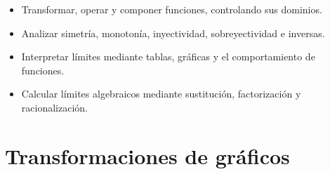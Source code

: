 \documentclass[10pt,a5paper]{article}
\begin{document}

\begin{objetivos}
\begin{itemize}
  \item Transformar, operar y componer funciones, controlando sus dominios.
  \item Analizar simetría, monotonía, inyectividad, sobreyectividad e inversas.
  \item Interpretar límites mediante tablas, gráficas y el comportamiento de funciones.
  \item Calcular límites algebraicos mediante sustitución, factorización y racionalización.
\end{itemize}
\end{objetivos}


\section*{Transformaciones de gráficos}
\end{document}
